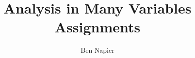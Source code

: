 \documentclass[a4paper, answers]{exam}
\title{Analysis in Many Variables Assignments}
\author{Ben Napier}
\begin{document}
    \maketitle
    \begin{questions}
%       
%       
%       
%       
%       
%       
%       
%       
        
    \end{questions}
\end{document}
